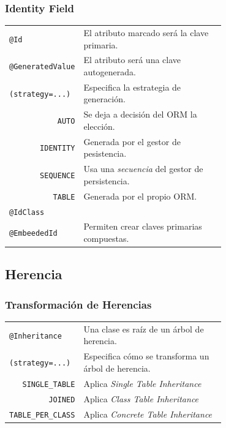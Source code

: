 \documentclass[handout,a4paper,slidestop,xcolor=pst,blue]{beamer}
\newcommand{\ann}[1]{\color{blue}\texttt{#1}\color{black}}
\begin{document}
\begin{frame}[c]
    \frametitle{Identity Field}
    \begin{tabular}{lp{0.70\linewidth}}
        \ann{@Id} & El atributo marcado será la clave primaria. \\
        \ann{@GeneratedValue} & El atributo será una clave autogenerada. \\
        \multicolumn{1}{l}{\ann{(strategy=...)}} & Especifica la estrategia de generación. \\
        \multicolumn{1}{r}{\texttt{AUTO}}     & Se deja a decisión del ORM la elección. \\
        \multicolumn{1}{r}{\texttt{IDENTITY}} & Generada por el gestor de pesistencia. \\
        \multicolumn{1}{r}{\texttt{SEQUENCE}} & Usa una \emph{secuencia} del gestor de persistencia. \\
        \multicolumn{1}{r}{\texttt{TABLE}}    & Generada por el propio ORM. \\
        \ann{@IdClass}    & \\
        \ann{@EmbeededId} & Permiten crear claves primarias compuestas.\\
    \end{tabular}
\end{frame}

\subsection{Herencia}

\begin{frame}[c]
    \frametitle{Transformación de Herencias}
    \begin{tabular}{lp{0.70\linewidth}}
        \ann{@Inheritance}                       &  Una clase es raíz de un árbol de herencia.          \\
        \multicolumn{1}{l}{\ann{(strategy=...)}} & Especifica cómo se transforma un árbol de herencia.  \\
        \multicolumn{1}{r}{\texttt{SINGLE\_TABLE}}    & Aplica \emph{Single Table Inheritance}    \\
        \multicolumn{1}{r}{\texttt{JOINED}}          & Aplica \emph{Class Table Inheritance}     \\
        \multicolumn{1}{r}{\texttt{TABLE\_PER\_CLASS}} & Aplica \emph{Concrete Table Inheritance}  \\
    \end{tabular}
\end{frame}
\end{document}
